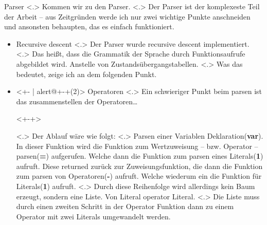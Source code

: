   \begin{frame}{Parser}
    \pause
        \note[item]<.>{
          Kommen wir zu den Parser.
        }
        \note[item]<.>{
          Der Parser ist der komplexeste Teil der Arbeit -- aus Zeitgründen werde ich nur zwei wichtige Punkte anschneiden und ansonsten behaupten, das es einfach funktioniert.
        }
    \begin{itemize}[<+- | alert@+>]
      \item
        Recursive descent
            \note[item]<.>{
              Der Parser wurde recursive descent implementiert.
            }
            \note[item]<.>{
              Das heißt, dass die Grammatik der Sprache durch Funktionsaufrufe abgebildet wird. Anstelle von Zustandsübergangstabellen.
            }
            \note[item]<.>{
              Was das bedeutet, zeige ich an dem folgenden Punkt.
            }
      \item<+- | alert@+-+(2)>
        Operatoren
            \note[item]<.>{
              Ein schwieriger Punkt beim parsen ist das zusammenstellen der Operatoren\ldots
            }

          \begin{uncoverenv}<+-+>%
          \end{uncoverenv}
            \note[item]<.>{
              Der Ablauf wäre wie folgt:
            }
            \note[item]<.>{
              Parsen einer Variablen Deklaration(\textbf{var}). In dieser Funktion wird die Funktion zum Wertzuweisung -- bzw. Operator -- parsen(\textbf{=}) aufgerufen. Welche dann die Funktion zum parsen eines Literals(\textbf{1}) aufruft. Diese returned zurück zur Zuweisungsfunktion, die dann die Funktion zum parsen von Operatoren(\textbf{-}) aufruft. Welche wiederum ein die Funktion für Literals(\textbf{1}) aufruft.
            }
            \note[item]<.>{
              Durch diese Reihenfolge wird allerdings kein Baum erzeugt, sondern eine Liste. Von Literal operator Literal.
            }
            \note[item]<.>{
              Die Liste muss durch einen zweiten Schritt in der Operator Funktion dann zu einem Operator mit zwei Literals umgewandelt werden.
            }


\end{itemize}
\end{frame}

